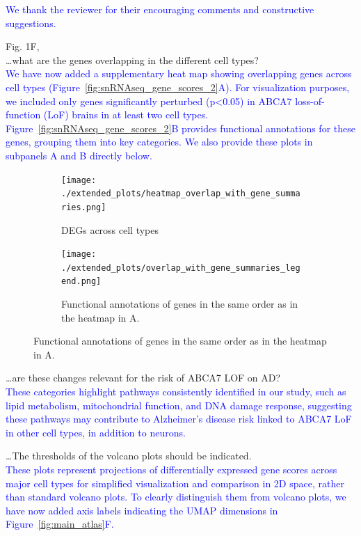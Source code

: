 \documentclass[12pt]{article}
\begin{document}
\textcolor{blue}{We thank the reviewer for their encouraging comments and constructive suggestions.}

Fig. 1F,\\
\dots what are the genes overlapping in the different cell types?\\ 
\textcolor{blue}{ We have now added a supplementary heat map showing overlapping genes across cell types (Figure~\ref{fig:snRNAseq_gene_scores_2}A). For visualization purposes, we included only genes significantly perturbed (p<0.05) in ABCA7 loss-of-function (LoF) brains in at least two cell types. Figure~\ref{fig:snRNAseq_gene_scores_2}B provides functional annotations for these genes, grouping them into key categories. We also provide these plots in subpanels A and B directly below.}

\begin{figure}[H] 
    \begin{subfigure}[t]{0.2\textwidth}
        \caption{DEGs across cell types}
        \texttt{[image: ./extended\_plots/heatmap\_overlap\_with\_gene\_summaries.png]}        
    \end{subfigure}   
	\hspace{2cm}
    \begin{subfigure}[t]{0.8\textwidth}
        \caption{Functional annotations of genes in the same order as in the heatmap in A.}
        \vspace{.5cm}
        \texttt{[image: ./extended\_plots/overlap\_with\_gene\_summaries\_legend.png]}        
    \end{subfigure}   
\end{figure}

\dots are these changes relevant for the risk of ABCA7 LOF on AD?\\ 
\textcolor{blue}{These categories highlight pathways consistently identified in our study, such as lipid metabolism, mitochondrial function, and DNA damage response, suggesting these pathways may contribute to Alzheimer’s disease risk linked to ABCA7 LoF in other cell types, in addition to neurons.}

\dots The thresholds of the volcano plots should be indicated.\\ 
\textcolor{blue}{These plots represent projections of differentially expressed gene scores across major cell types for simplified visualization and comparison in 2D space, rather than standard volcano plots. To clearly distinguish them from volcano plots, we have now added axis labels indicating the UMAP dimensions in Figure~\ref{fig:main_atlas}F.}
\end{document}

